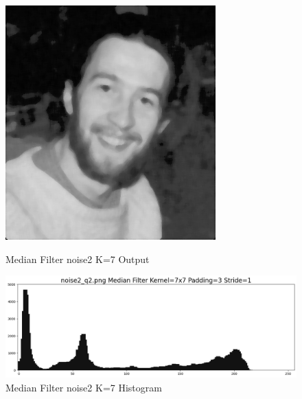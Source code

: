 \documentclass[12pt,a4paper]{report}
\begin{document}
\begin{figure}[!htb]
  \includegraphics[width=1\linewidth]{output/noise2_q2_K7P3.png}
  \caption{Median Filter noise2 K=7 Output}
  \includegraphics[width=1\linewidth]{output/noise2_q2_K7P3_his.png}
  \caption{Median Filter noise2 K=7 Histogram}
\end{figure}
\end{document}

